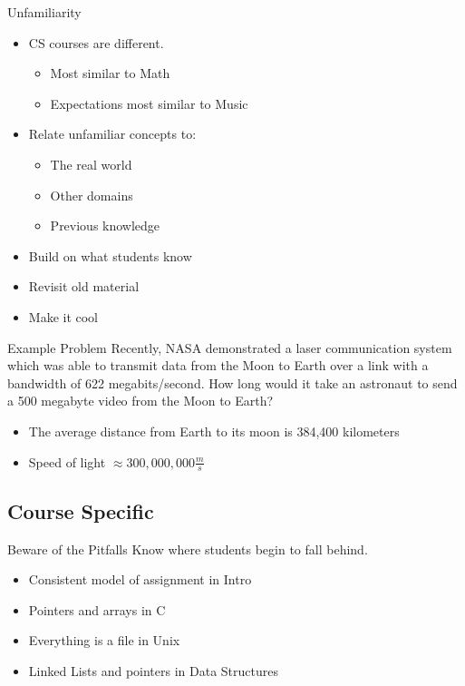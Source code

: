 \documentclass[11pt]{beamer}
\begin{document}
\begin{frame}{Unfamiliarity}
	\begin{itemize}
		\item CS courses are different.
		\begin{itemize}
			\item Most similar to Math
			\item Expectations most similar to Music
		\end{itemize}
		
		\item Relate unfamiliar concepts to:
		\begin{itemize}
			\item The real world
			\item Other domains
			\item Previous knowledge
		\end{itemize}
		\item Build on what students know
		\item Revisit old material
		\item Make it cool
		
	\end{itemize}
\end{frame}

\begin{frame}{Example Problem}
	Recently, NASA demonstrated a laser communication system which was able to transmit data from the Moon to Earth over a link with a bandwidth of 622 megabits/second.  How long would it take an astronaut to send a 500 megabyte video from the Moon to Earth?
	
	\begin{itemize}
		\item The average distance from Earth to its moon is 384,400 kilometers
		
		\item Speed of light  $\approx 300,000,000  \frac{m}{s} $
		
	\end{itemize}
\end{frame}

\subsection{Course Specific}


\begin{frame}{Beware of the Pitfalls}
	Know where students begin to fall behind.
	\begin{itemize}
		\item Consistent model of assignment in Intro
		\item Pointers and arrays in C
		\item Everything is a file in Unix
		\item Linked Lists and pointers in Data Structures
	\end{itemize}
\end{frame}
\end{document}
